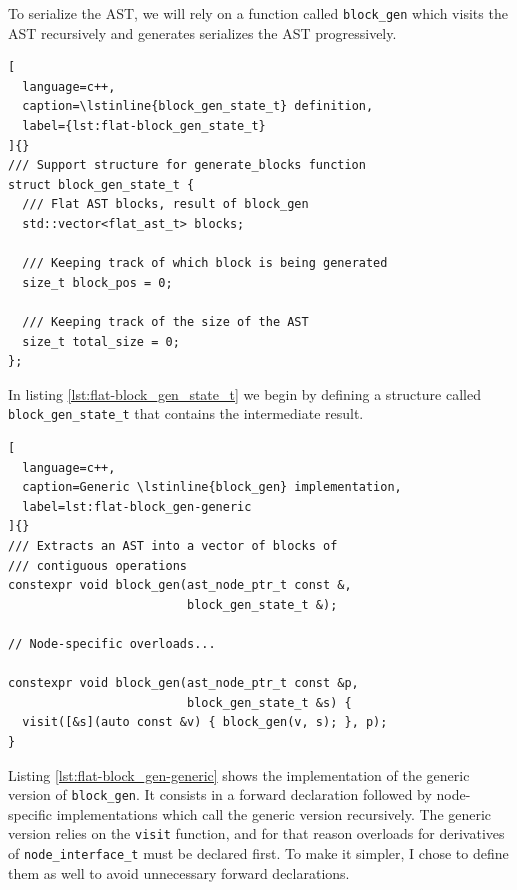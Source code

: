 \documentclass[../main]{subfiles}
\begin{document}
To serialize the AST, we will rely on a function called \lstinline{block_gen}
which visits the AST recursively and generates serializes the AST progressively.

\begin{lstlisting}[
  language=c++,
  caption=\lstinline{block_gen_state_t} definition,
  label={lst:flat-block_gen_state_t}
]{}
/// Support structure for generate_blocks function
struct block_gen_state_t {
  /// Flat AST blocks, result of block_gen
  std::vector<flat_ast_t> blocks;

  /// Keeping track of which block is being generated
  size_t block_pos = 0;

  /// Keeping track of the size of the AST
  size_t total_size = 0;
};
\end{lstlisting}

In listing \ref{lst:flat-block_gen_state_t} we begin by defining a structure
called \lstinline{block_gen_state_t} that contains the intermediate result.

\begin{lstlisting}[
  language=c++,
  caption=Generic \lstinline{block_gen} implementation,
  label=lst:flat-block_gen-generic
]{}
/// Extracts an AST into a vector of blocks of
/// contiguous operations
constexpr void block_gen(ast_node_ptr_t const &,
                         block_gen_state_t &);

// Node-specific overloads...

constexpr void block_gen(ast_node_ptr_t const &p,
                         block_gen_state_t &s) {
  visit([&s](auto const &v) { block_gen(v, s); }, p);
}
\end{lstlisting}

Listing \ref{lst:flat-block_gen-generic} shows the implementation of the generic
version of \lstinline{block_gen}. It consists in a forward declaration
followed by node-specific implementations which call the generic version
recursively. The generic version relies on the \lstinline{visit} function,
and for that reason overloads for derivatives of \lstinline{node_interface_t}
must be declared first. To make it simpler, I chose to define them as well
to avoid unnecessary forward declarations.
\end{document}
